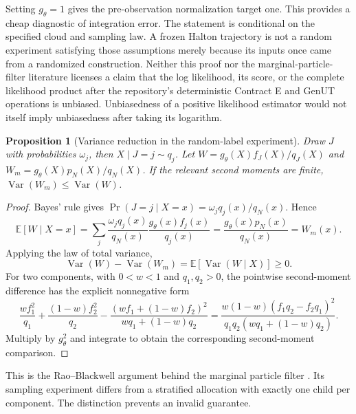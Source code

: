 \documentclass[11pt]{article}
\newtheorem{proposition}{Proposition}
\newcommand{\E}{\mathbb E}
\newcommand{\Var}{\operatorname{Var}}
\begin{document}
Setting $g_\theta=1$ gives the pre-observation normalization target one.
This provides a cheap diagnostic of integration error. The statement is
conditional on the specified cloud and sampling law. A frozen Halton
trajectory is not a random experiment satisfying those assumptions merely
because its inputs once came from a randomized construction. Neither this
proof nor the marginal-particle-filter literature licenses a claim that the
log likelihood, its score, or the complete likelihood product after the
repository's deterministic Contract E and GenUT operations is unbiased.
Unbiasedness of a positive likelihood estimator would not itself imply
unbiasedness after taking its logarithm.

\begin{proposition}[Variance reduction in the random-label experiment]
\label{prop:variance}
Draw $J$ with probabilities $\omega_j$, then $X\mid J=j\sim q_j$.
Let $W=g_\theta(X)f_J(X)/q_J(X)$ and
$W_m=g_\theta(X)p_N(X)/q_N(X)$. If the relevant second moments are finite,
$\Var(W_m)\leq\Var(W)$.
\end{proposition}
\begin{proof}
Bayes' rule gives
$\Pr(J=j\mid X=x)=\omega_j q_j(x)/q_N(x)$. Hence
\begin{equation}
 \E[W\mid X=x]
 =\sum_j\frac{\omega_j q_j(x)}{q_N(x)}
                    \frac{g_\theta(x)f_j(x)}{q_j(x)}
 =\frac{g_\theta(x)p_N(x)}{q_N(x)}=W_m(x).
 \label{eq:rb-proof}
\end{equation}
Applying the law of total variance,
\begin{equation}
 \Var(W)-\Var(W_m)=\E[\Var(W\mid X)]\geq0.
 \label{eq:variance-decomposition}
\end{equation}
For two components, with $0<w<1$ and $q_1,q_2>0$, the pointwise
second-moment difference has the explicit nonnegative form
\begin{equation}
 \frac{wf_1^2}{q_1}+\frac{(1-w)f_2^2}{q_2}
 -\frac{(wf_1+(1-w)f_2)^2}{wq_1+(1-w)q_2}
 =
 \frac{w(1-w)(f_1q_2-f_2q_1)^2}
      {q_1q_2(wq_1+(1-w)q_2)} .
 \label{eq:two-component-square}
\end{equation}
Multiply by $g_\theta^2$ and integrate to obtain the corresponding
second-moment comparison.
\end{proof}

This is the Rao--Blackwell argument behind the marginal particle filter
\cite[Sec.~3, Fig.~3, Sec.~3.1 and Prop.~1]{klaas}.
Its sampling experiment differs from a stratified allocation with exactly
one child per component. The distinction prevents an invalid guarantee.
\end{document}
